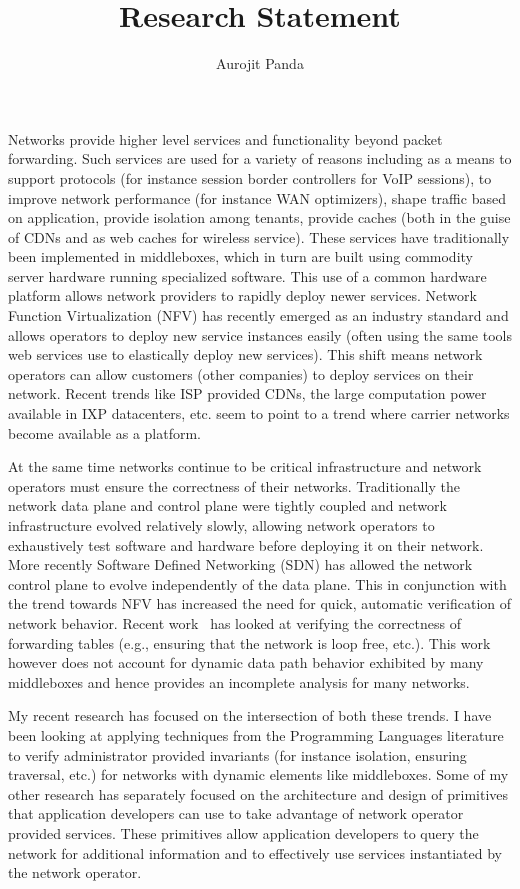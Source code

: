\documentclass[letterpaper]{article}
\begin{document}
\title{\Large Research Statement}
\author{Aurojit Panda}
\date{}
\thispagestyle{empty}
\maketitle
Networks provide higher level services and functionality beyond packet forwarding. Such services are used for
a variety of reasons including as a means to support protocols (for instance session border controllers for
VoIP sessions), to improve network performance (for instance WAN optimizers), shape traffic based on
application, provide isolation among tenants, provide caches (both in the guise of CDNs and as web caches for
wireless service). These services have traditionally been implemented in middleboxes, which in turn are built
using commodity server hardware running specialized software. This use of a common hardware platform allows
network providers to rapidly deploy newer services. Network Function Virtualization (NFV) has recently emerged
as an industry standard and allows operators to deploy new service instances easily (often using the same
tools web services use to elastically deploy new services).  This shift means network operators can allow
customers (other companies) to deploy services on their network.  Recent trends like ISP provided CDNs, the
large computation power available in IXP datacenters, etc. seem to point to a trend where carrier networks
become available as a platform.

At the same time networks continue to be critical infrastructure and network operators must ensure the
correctness of their networks. Traditionally the network data plane and control plane were tightly coupled and
network infrastructure evolved relatively slowly, allowing network operators to exhaustively test software and
hardware before deploying it on their network. More recently Software Defined Networking (SDN) has
allowed the network control plane to evolve independently of the data plane. This in conjunction with the
trend towards NFV has increased the need for quick, automatic verification of network behavior. Recent
work~\cite{khurshid13veriflow, kazemian2012header} has looked at verifying the correctness of forwarding
tables (e.g., ensuring that the network is loop free, etc.). This work however does not account for dynamic
data path behavior exhibited by many middleboxes and hence provides an incomplete analysis for many networks.

My recent research has focused on the intersection of both these trends. I have been looking at applying
techniques from the Programming Languages literature to verify administrator provided invariants (for instance
isolation, ensuring traversal, etc.) for networks with dynamic elements like middleboxes. Some of my other
research has separately focused on the architecture and design of primitives that application developers can
use to take advantage of network operator provided services. These primitives allow application developers to
query the network for additional information and to effectively use services instantiated by the network
operator.
\end{document}
